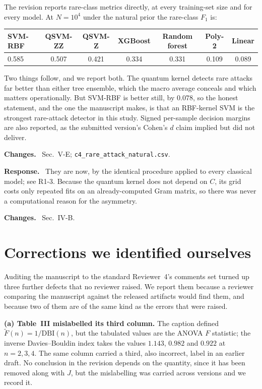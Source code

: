 \documentclass[11pt,a4paper]{article}
\newcommand{\itemhead}[2]{%
  \par\addvspace{15pt}%
  \noindent{\bfseries\color{tagink}#1}\hspace{0.7em}{\bfseries #2}%
  \par\addvspace{3.5pt}%
  \noindent{\color{rulegray}\rule{\linewidth}{0.5pt}}%
  \par\addvspace{5pt}%
  \nobreak}
\newcommand{\resp}{\par\addvspace{2pt}\noindent\textbf{Response.}\ }
\newcommand{\changed}{\par\addvspace{5pt}\noindent
  {\bfseries\color{tagink}Changes.}\ }
\begin{document}
The revision reports rare-class metrics directly, at every training-set size and
for every model. At $N=10^{4}$ under the natural prior the rare-class $F_1$ is:

\begin{center}
\small
\begin{tabular}{@{}lcccccc@{}}
\toprule
SVM-RBF & QSVM-ZZ & QSVM-Z & XGBoost & Random forest & Poly-2 & Linear \\
\midrule
0.585 & 0.507 & 0.421 & 0.334 & 0.331 & 0.109 & 0.089 \\
\bottomrule
\end{tabular}
\end{center}

Two things follow, and we report both. The quantum kernel detects rare attacks
far better than either tree ensemble, which the macro average conceals and which
matters operationally. But SVM-RBF is better still, by $0.078$, so the honest
statement, and the one the manuscript makes, is that an RBF-kernel SVM is the
strongest rare-attack detector in this study. Signed per-sample decision margins
are also reported, as the submitted version's Cohen's $d$ claim implied but did
not deliver.
\changed
Sec.~V-E; \texttt{c4\_rare\_attack\_natural.csv}.

\itemhead{R4-6}{The quantum kernel's hyper-parameters were not tuned}
\resp
They are now, by the identical procedure applied to every classical model; see
R1-3. Because the quantum kernel does not depend on $C$, its grid costs only
repeated fits on an already-computed Gram matrix, so there was never a
computational reason for the asymmetry.
\changed
Sec.~IV-B.

\section{Corrections we identified ourselves}
\label{sec:selfreported}

Auditing the manuscript to the standard Reviewer~4's comments set turned up
three further defects that no reviewer raised. We report them because a reviewer
comparing the manuscript against the released artifacts would find them, and
because two of them are of the same kind as the errors that were raised.

\textbf{(a) Table~III mislabelled its third column.} The caption defined
$\tilde F(n)=1/\mathrm{DBI}(n)$, but the tabulated values are the ANOVA $F$
statistic; the inverse Davies--Bouldin index takes the values $1.143$, $0.982$
and $0.922$ at $n=2,3,4$. The same column carried a third, also incorrect,
label in an earlier draft. No conclusion in the revision depends on the
quantity, since it has been removed along with $J$, but the mislabelling was
carried across versions and we record it.
\end{document}
